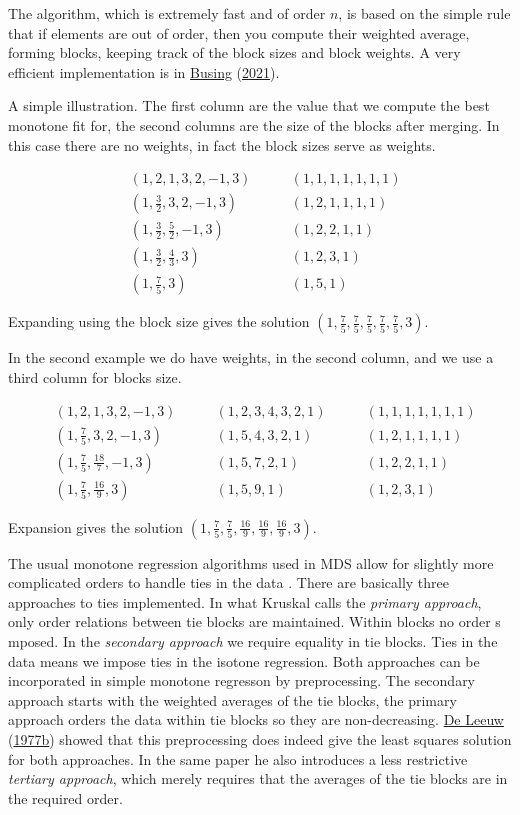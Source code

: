 \documentclass[
  12pt,
]{book}
\theoremstyle{definition}
\theoremstyle{definition}
\theoremstyle{definition}
\theoremstyle{definition}
\theoremstyle{remark}
\begin{document}
The algorithm, which is extremely fast and of order \(n\), is based on the simple rule that if elements are out of order, then you compute their weighted average, forming blocks, keeping track of the block sizes and block weights. A very efficient implementation is in \protect\hyperlink{ref-busing_21}{Busing} (\protect\hyperlink{ref-busing_21}{2021}).

A simple illustration. The first column are the value that we compute the best monotone fit for, the second columns are the size of the blocks after merging. In this case there are no weights, in fact the block sizes serve as weights.

\begin{align}
&(1,2,1,3,2,-1,3) \qquad &(1,1,1,1,1,1,1)\\
&(1,\frac32,3,2,-1,3) \qquad &(1,2,1,1,1,1)\\
&(1,\frac32,\frac52,-1,3) \qquad &(1,2,2,1,1)\\
&(1,\frac32,\frac43,3) \qquad &(1,2,3,1)\\
&(1,\frac75,3) \qquad &(1,5,1)
\end{align}

Expanding using the block size gives the solution \((1,\frac75,\frac75,\frac75,\frac75,\frac75,3)\).

In the second example we do have weights, in the second column, and we use a third
column for blocks size.

\begin{align}
&(1,2,1,3,2,-1,3) \qquad &(1,2,3,4,3,2,1) \qquad &(1,1,1,1,1,1,1)\\
&(1,\frac75,3,2,-1,3) \qquad &(1,5,4,3,2,1) \qquad &(1,2,1,1,1,1)\\
&(1,\frac75,\frac{18}{7},-1,3) \qquad &(1,5,7,2,1) \qquad &(1,2,2,1,1)\\
&(1,\frac75,\frac{16}{9},3) \qquad &(1,5,9,1) \qquad &(1,2,3,1)
\end{align}

Expansion gives the solution \((1,\frac75,\frac75,\frac{16}{9},\frac{16}{9},\frac{16}{9},3)\).

The usual monotone regression algorithms used in MDS
allow for slightly more complicated orders to handle
ties in the data . There are basically three
approaches to ties implemented. In what Kruskal calls the \emph{primary approach},
only order relations between tie blocks are maintained. Within blocks no
order s mposed. In the \emph{secondary approach} we require equality in tie
blocks. Ties in the data means we impose ties in the isotone regression.
Both approaches can be incorporated in simple monotone regresson by
preprocessing. The secondary approach starts with the weighted
averages of the tie blocks, the primary approach orders the data within
tie blocks so they are non-decreasing. \protect\hyperlink{ref-deleeuw_A_77}{De Leeuw} (\protect\hyperlink{ref-deleeuw_A_77}{1977b}) showed that this preprocessing
does indeed give the least squares solution for both approaches. In the same paper he also
introduces a less restrictive \emph{tertiary approach}, which merely requires that the averages of the tie blocks are in the required order.
\end{document}
